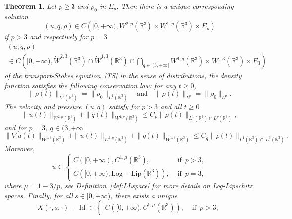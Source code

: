 \documentclass[10pt]{amsart}
\newtheorem{theo}{Theorem}[section]
\theoremstyle{definition}\newtheorem{defi}[theo]{Definition}\newtheorem{rema}[theo]{Remark}\newtheorem{exam}[theo]{Example}\newtheorem{exem}[theo]{Example}\newtheorem{nota}[theo]{Notation}
\newcommand{\LLip}{\mathrm{Log-Lip}}
\newcommand{\R}{\mathbb{R}}
\renewcommand{\leq}{\leqslant}
\renewcommand{\geq}{\geqslant}
\newcommand{\Id}{\operatorname{Id}}
\begin{document}
\begin{theo} \label{thm0}
Let $p\geq 3$ and $\rho_0$ in $E_p$. Then there is a unique corresponding solution
\[
(u,q,\rho) \in C\left([0,+\infty),W^{2,p} \left(\R^3\right) \times W^{1,p} \left(\R^3\right)\times E_p\right)
\]
if $p>3$ and respectively for $p=3$
\begin{multline*}
(u,q,\rho) \\
\in C\left([0,+\infty),\dot{W}^{2,3} \left(\R^3\right) 
\cap \dot{W}^{1,3} \left(\R^3\right)\cap \underset{q\,\in\,(3,+\infty]}{\bigcap} W^{1,q}\left(\R^3\right) \times W^{1,3} \left(\R^3\right)\times E_3\right)
\end{multline*}
of the transport-Stokes equation~\eqref{TS} in the sense of distributions, the density function satisfies the following conservation law: for any $t\geq 0$,
\begin{equation}\label{conserLp}
\|\rho(t)\|_{ L^1 \left(\R^3\right) } =\|\rho_0\|_{ L^1 \left(\R^3\right) } \quad \text{and} \quad \|\rho(t)\|_{L^p} =\|\rho_0\|_{L^p}.
\end{equation}
The velocity and pressure $(u,q)$ satisfy for $p>3$ and all $t\geq 0$
\begin{equation}\label{reg_u,p}
\|u(t)\|_{W^{2,p}\left(\R^3\right)}+ \|q(t)\|_{W^{1,p}\left(\R^3\right)} \leq C_p \| \rho(t) \|_{L^1\left(\R^3\right)\cap L^p\left(\R^3\right)},
\end{equation}
and for $p=3$, $q\in(3,+\infty]$
\begin{equation}\label{reg_u,p_bis}
\|\nabla u(t)\|_{W^{1,3}\left(\R^3\right)}+\|u(t)\|_{W^{1,q}\left(\R^3\right)}+ \|q(t)\|_{W^{1,3}\left(\R^3\right)} \leq C_q \| \rho(t) \|_{L^1\left(\R^3\right)\,\cap\,L^3\left(\R^3\right)}.
\end{equation}
Moreover,
\begin{equation}\label{ulipoullip}
u \in
\begin{cases}
C([0,+\infty), C^{1,\mu} \left(\R^3\right), & \text{ if } \, p > 3,
\\ C\left([0,+\infty), \LLip \left(\R^3\right)\right), & \text{ if } \, p = 3,
\end{cases}
\end{equation}
where $\mu=1-3/p$, see Definition~\ref{def:LLspace} for more details on Log-Lipschitz spaces. Finally, for all $s\in[0,+\infty)$, there exists a unique
\begin{equation}\label{uflox}
X(\cdot,s,\cdot)-\Id \in
\begin{cases}
C\left([0,+\infty), C^{1,\mu} \left(\R^3\right)\right), & \text{ if } \, p > 3,

\end{cases}
\end{equation}
\end{theo}
\end{document}
